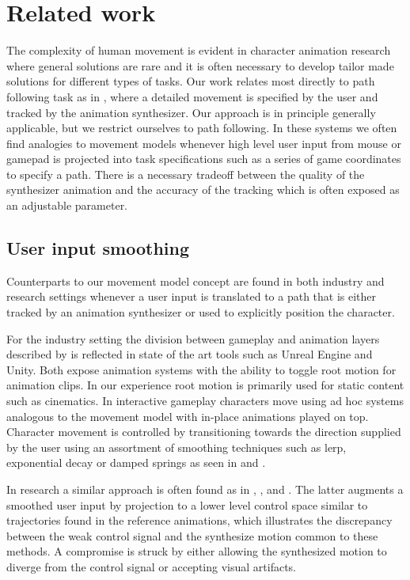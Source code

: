 \section{Related work}
The complexity of human movement is evident in character animation research where general solutions are rare and it is often necessary to develop tailor made solutions for different types of tasks. Our work relates most directly to path following task as in \citep{lee10}, \citep{holden.16} where a detailed movement is specified by the user and tracked by the animation synthesizer. Our approach is in principle generally applicable, but we restrict ourselves to path following. In these systems we often find analogies to movement models whenever high level user input from mouse or gamepad is projected into task specifications such as a series of game coordinates to specify a path. There is a necessary tradeoff between the quality of the synthesizer animation and the accuracy of the tracking which is often exposed as an adjustable parameter.

\subsection{User input smoothing}
Counterparts to our movement model concept are found in both industry and research settings whenever a user input is translated to a path that is either tracked by an animation synthesizer or used to explicitly position the character.

For the industry setting the division between gameplay and animation layers described by \citep{holden18} is reflected in state of the art tools such as Unreal Engine and Unity. Both expose animation systems with the ability to toggle root motion for animation clips. In our experience root motion is primarily used for static content such as cinematics. In interactive gameplay characters move using ad hoc systems analogous to the movement model with in-place animations played on top. Character movement is controlled by transitioning towards the direction supplied by the user using an assortment of smoothing techniques such as lerp, exponential decay or damped springs as seen in \citep{buttner20} and \citep{holden21}.

In research a similar approach is often found as in \citep{mccann07}, \citep{holden.16}, \citep{Zhang18} and \citep{startke20}. The latter augments a smoothed user input by projection to a lower level control space similar to trajectories found in the reference animations, which illustrates the discrepancy between the weak control signal and the synthesize motion common to these methods. A compromise is struck by either allowing the synthesized motion to diverge from the control signal or accepting visual artifacts.

